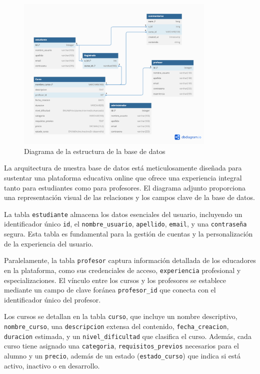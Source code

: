 \documentclass[
]{article}
\begin{document}
\begin{figure}
\centering
\includegraphics[width=0.85\textwidth,height=\textheight]{../img/diagrama.png}
\caption{Diagrama de la estructura de la base de datos}
\end{figure}

La arquitectura de nuestra base de datos está meticulosamente diseñada
para sustentar una plataforma educativa online que ofrece una
experiencia integral tanto para estudiantes como para profesores. El
diagrama adjunto proporciona una representación visual de las relaciones
y los campos clave de la base de datos.

La tabla \texttt{estudiante} almacena los datos esenciales del usuario,
incluyendo un identificador único \texttt{id}, el
\texttt{nombre\_usuario}, \texttt{apellido}, \texttt{email}, y una
\texttt{contraseña} segura. Esta tabla es fundamental para la gestión de
cuentas y la personalización de la experiencia del usuario.

Paralelamente, la tabla \texttt{profesor} captura información detallada
de los educadores en la plataforma, como sus credenciales de acceso,
\texttt{experiencia} profesional y especializaciones. El vínculo entre
los cursos y los profesores se establece mediante un campo de clave
foránea \texttt{profesor\_id} que conecta con el identificador único del
profesor.

Los cursos se detallan en la tabla \texttt{curso}, que incluye un nombre
descriptivo, \texttt{nombre\_curso}, una \texttt{descripcion} extensa
del contenido, \texttt{fecha\_creacion}, \texttt{duracion} estimada, y
un \texttt{nivel\_dificultad} que clasifica el curso. Además, cada curso
tiene asignado una \texttt{categoria}, \texttt{requisitos\_previos}
necesarios para el alumno y un \texttt{precio}, además de un estado
(\texttt{estado\_curso}) que indica si está activo, inactivo o en
desarrollo.
\end{document}
